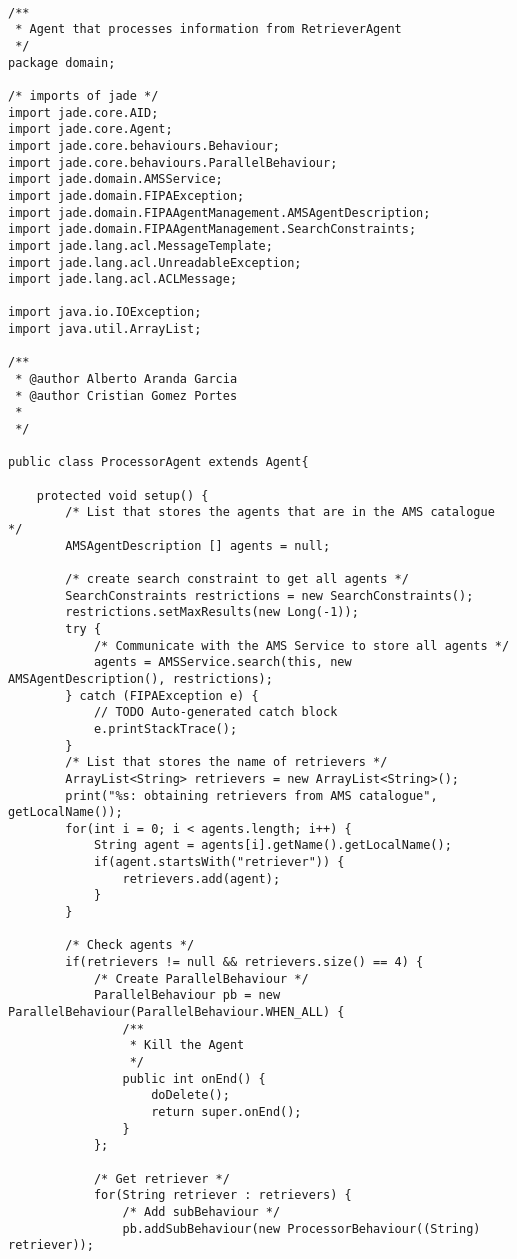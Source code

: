 \documentclass{pre-tfg}
\begin{document}
\begin{lstlisting}[caption=Código de extracción de anuncios de varios links de una URL,style=java]

/**
 * Agent that processes information from RetrieverAgent
 */
package domain;

/* imports of jade */
import jade.core.AID;
import jade.core.Agent;
import jade.core.behaviours.Behaviour;
import jade.core.behaviours.ParallelBehaviour;
import jade.domain.AMSService;
import jade.domain.FIPAException;
import jade.domain.FIPAAgentManagement.AMSAgentDescription;
import jade.domain.FIPAAgentManagement.SearchConstraints;
import jade.lang.acl.MessageTemplate;
import jade.lang.acl.UnreadableException;
import jade.lang.acl.ACLMessage;

import java.io.IOException;
import java.util.ArrayList;

/**
 * @author Alberto Aranda Garcia
 * @author Cristian Gomez Portes
 *
 */

public class ProcessorAgent extends Agent{

	protected void setup() {
		/* List that stores the agents that are in the AMS catalogue */
		AMSAgentDescription [] agents = null;
		
		/* create search constraint to get all agents */
		SearchConstraints restrictions = new SearchConstraints();
		restrictions.setMaxResults(new Long(-1));
		try {
			/* Communicate with the AMS Service to store all agents */
			agents = AMSService.search(this, new AMSAgentDescription(), restrictions);
		} catch (FIPAException e) {
			// TODO Auto-generated catch block
			e.printStackTrace();
		}
		/* List that stores the name of retrievers */
		ArrayList<String> retrievers = new ArrayList<String>();
		print("%s: obtaining retrievers from AMS catalogue", getLocalName());
		for(int i = 0; i < agents.length; i++) {
			String agent = agents[i].getName().getLocalName();
			if(agent.startsWith("retriever")) {
				retrievers.add(agent);
			}
		}
		
		/* Check agents */
		if(retrievers != null && retrievers.size() == 4) {
			/* Create ParallelBehaviour */
			ParallelBehaviour pb = new ParallelBehaviour(ParallelBehaviour.WHEN_ALL) {
				/**
				 * Kill the Agent
				 */
				public int onEnd() {
					doDelete();
					return super.onEnd();
				}
			};

			/* Get retriever */
			for(String retriever : retrievers) {
				/* Add subBehaviour */
				pb.addSubBehaviour(new ProcessorBehaviour((String) retriever));


\end{lstlisting}
\end{document}
